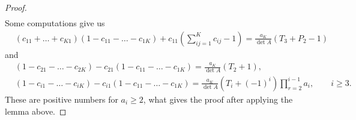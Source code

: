 \documentclass[pdftex]{sigma}
\numberwithin{equation}{section}
\begin{document}
\begin{proof}
\begin{align*}
 \end{align*}
 Some computations give us
 \begin{align*}
 & (c_{11}+\dots + c_{K1}) (1 - c_{11} - \dots - c_{1K}) + c_{11} \left( \sum_{ij=1}^K c_{ij} -1\right) = \frac{a_K}{\det A} (T_3 + P_2 -1)
 \end{align*}
 and
 \begin{align*}
 &(1 - c_{21} - \dots - c_{2K}) - c_{21} (1 - c_{11} - \dots - c_{1K}) = \frac{a_K}{\det A} (T_2 + 1),
 \\
 &(1 - c_{i1} - \dots - c_{iK}) - c_{i1} (1 - c_{11} - \dots - c_{1K}) = \frac{a_K}{\det A} \left(T_i + (-1)^i\right) \prod_{r=2}^{i-1} a_i, \qquad i \ge 3.
 \end{align*}
 These are positive numbers for $a_i \ge 2$, what gives the proof after applying the lemma above.
\end{proof}
\end{document}

